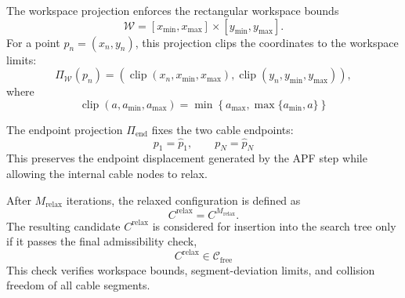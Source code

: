 \documentclass{pas}
\begin{document}

The workspace projection enforces the rectangular workspace bounds
\[
\mathcal{W}
=
[x_{\min},x_{\max}]
\times
[y_{\min},y_{\max}] .
\]
For a point \(p_n=(x_n,y_n)\), this projection clips the coordinates to the
workspace limits:
\begin{equation}
\Pi_{\mathcal{W}}(p_n)
=
\left(
\operatorname{clip}(x_n,x_{\min},x_{\max}),
\operatorname{clip}(y_n,y_{\min},y_{\max})
\right),
\label{eq:relaxation_workspace_projection}
\end{equation}
where
\begin{equation}
\operatorname{clip}(a,a_{\min},a_{\max})
=
\min
\left\{
a_{\max},
\max\{a_{\min},a\}
\right\}
\label{eq:relaxation_clip_operator}
\end{equation}

The endpoint projection \(\Pi_{\mathrm{end}}\) fixes the two cable endpoints:
\begin{equation}
p_1=\widehat{p}_1,
\qquad
p_N=\widehat{p}_N 
\label{eq:relaxation_endpoint_constraint}
\end{equation}
This preserves the endpoint displacement generated by the APF step while
allowing the internal cable nodes to relax.

After \(M_{\mathrm{relax}}\) iterations, the relaxed configuration is defined as
\begin{equation}
C^{\mathrm{relax}}=C^{M_{\mathrm{relax}}}.
\label{eq:relaxed_configuration_result}
\end{equation}
The resulting candidate \(C^{\mathrm{relax}}\) is considered for insertion into the search tree only if it passes the final admissibility check,
\begin{equation}
C^{\mathrm{relax}}\in\mathcal{C}_{\mathrm{free}}
\label{eq:relaxed_static_validation}
\end{equation}
This check verifies workspace bounds, segment-deviation limits, and collision
freedom of all cable segments.
\end{document}
